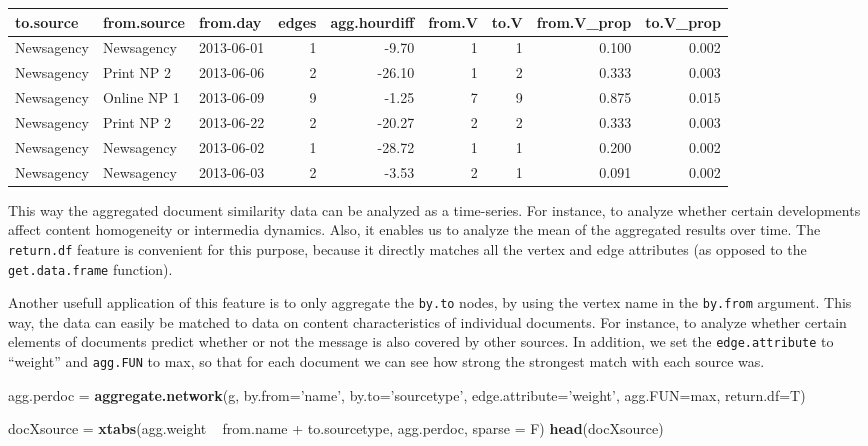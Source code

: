 \documentclass[]{article}
\newenvironment{Shaded}{\begin{snugshade}}{\end{snugshade}}
\newcommand{\KeywordTok}[1]{\textcolor[rgb]{0.13,0.29,0.53}{\textbf{{#1}}}}
\newcommand{\DataTypeTok}[1]{\textcolor[rgb]{0.13,0.29,0.53}{{#1}}}
\newcommand{\StringTok}[1]{\textcolor[rgb]{0.31,0.60,0.02}{{#1}}}
\newcommand{\NormalTok}[1]{{#1}}
\begin{document}
\begin{longtable}[c]{@{}lllrrrrrr@{}}
\toprule
to.source & from.source & from.day & edges & agg.hourdiff & from.V &
to.V & from.V\_prop & to.V\_prop\tabularnewline
\midrule
\endhead
Newsagency & Newsagency & 2013-06-01 & 1 & -9.70 & 1 & 1 & 0.100 &
0.002\tabularnewline
Newsagency & Print NP 2 & 2013-06-06 & 2 & -26.10 & 1 & 2 & 0.333 &
0.003\tabularnewline
Newsagency & Online NP 1 & 2013-06-09 & 9 & -1.25 & 7 & 9 & 0.875 &
0.015\tabularnewline
Newsagency & Print NP 2 & 2013-06-22 & 2 & -20.27 & 2 & 2 & 0.333 &
0.003\tabularnewline
Newsagency & Newsagency & 2013-06-02 & 1 & -28.72 & 1 & 1 & 0.200 &
0.002\tabularnewline
Newsagency & Newsagency & 2013-06-03 & 2 & -3.53 & 2 & 1 & 0.091 &
0.002\tabularnewline
\bottomrule
\end{longtable}

This way the aggregated document similarity data can be analyzed as a
time-series. For instance, to analyze whether certain developments
affect content homogeneity or intermedia dynamics. Also, it enables us
to analyze the mean of the aggregated results over time. The
\texttt{return.df} feature is convenient for this purpose, because it
directly matches all the vertex and edge attributes (as opposed to the
\texttt{get.data.frame} function).

Another usefull application of this feature is to only aggregate the
\texttt{by.to} nodes, by using the vertex name in the \texttt{by.from}
argument. This way, the data can easily be matched to data on content
characteristics of individual documents. For instance, to analyze
whether certain elements of documents predict whether or not the message
is also covered by other sources. In addition, we set the
\texttt{edge.attribute} to ``weight'' and \texttt{agg.FUN} to max, so
that for each document we can see how strong the strongest match with
each source was.

\begin{Shaded}
\begin{Highlighting}[]
\NormalTok{agg.perdoc =}\StringTok{ }\KeywordTok{aggregate.network}\NormalTok{(g, }\DataTypeTok{by.from=}\StringTok{'name'}\NormalTok{, }\DataTypeTok{by.to=}\StringTok{'sourcetype'}\NormalTok{, }
                                  \DataTypeTok{edge.attribute=}\StringTok{'weight'}\NormalTok{, }\DataTypeTok{agg.FUN=}\NormalTok{max, }
                                  \DataTypeTok{return.df=}\NormalTok{T)}

\NormalTok{docXsource =}\StringTok{ }\KeywordTok{xtabs}\NormalTok{(agg.weight ~}\StringTok{ }\NormalTok{from.name +}\StringTok{ }\NormalTok{to.sourcetype, agg.perdoc, }\DataTypeTok{sparse =} \NormalTok{F)}
\KeywordTok{head}\NormalTok{(docXsource)}
\end{Highlighting}
\end{Shaded}
\end{document}

